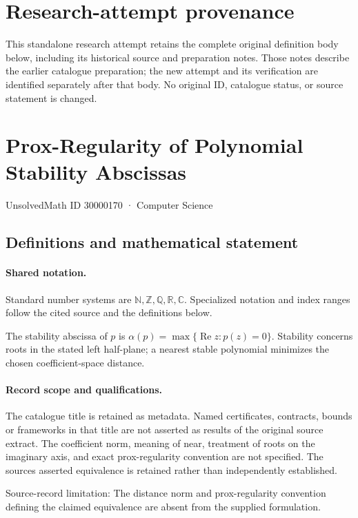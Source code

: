 \documentclass[11pt]{article}
\begin{document}
\section*{Research-attempt provenance}
This standalone research attempt retains the complete original definition body below,
including its historical source and preparation notes. Those notes describe the
earlier catalogue preparation; the new attempt and its verification are identified
separately after that body. No original ID, catalogue status, or source statement is changed.

\section{Prox-Regularity of Polynomial Stability Abscissas}\label{30000170}
{\small UnsolvedMath ID 30000170 · Computer Science}
\subsection{Definitions and mathematical statement}

\paragraph{Shared notation.}Standard number systems are $\mathbb N,\mathbb Z,\mathbb Q,\mathbb R,\mathbb C$. Specialized notation and index ranges follow the cited source and the definitions below.


The stability abscissa of $p$ is $\alpha(p)=\max\{\operatorname{Re}z:p(z)=0\}$. Stability concerns roots in the stated left half-plane; a nearest stable polynomial minimizes the chosen coefficient-space distance.
\paragraph{Record scope and qualifications.}
The catalogue title is retained as metadata. Named certificates, contracts, bounds or frameworks in that title are not asserted as results of the original source extract.
The coefficient norm, meaning of near, treatment of roots on the imaginary axis, and exact prox-regularity convention are not specified. The source\textquotesingle s asserted equivalence is retained rather than independently established.

Source-record limitation: The distance norm and prox-regularity convention defining the claimed equivalence are absent from the supplied formulation.
\end{document}
